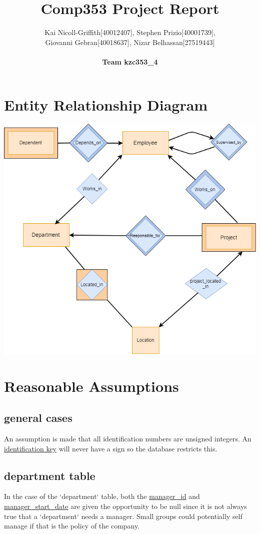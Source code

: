 \documentclass[11pt,letterpaper]{article}
\title{Comp353 Project Report}
\author{Kai Nicoll-Griffith[40012407], Stephen Prizio[40001739], \\Giovanni Gebran[40018637], Nizar Belhassan[27519443]\\\\\bf{Team kzc353\_4}}
\begin{document}
	
	
		\maketitle
		\newcommand{\graphicwidth}{18.5cm}
	\section{Entity Relationship Diagram}
\hspace*{-1.1cm}\includegraphics[width=\graphicwidth]{erd.png}
	\section{Reasonable Assumptions}
		\subsection{general cases}
	An assumption is made that all identification numbers are unsigned integers. An \uline{identification key} will never have a sign so the database restricts this. \\	
	
	\subsection{department table}
	In the case of the `department` table, both the \uline{manager\_id} and \uline{manager\_start\_date} are given the opportunity to be null since it is not always true that a `department` needs a manager. Small groups could potentially self manage if that is the policy of the company. \\
\end{document}
